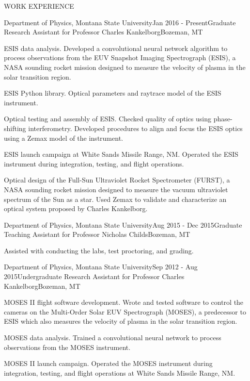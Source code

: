 \documentclass{resume} %
\begin{document}

\begin{rSection}{WORK EXPERIENCE}
\begin{rSubsection}{Department of Physics, Montana State University}{Jan 2016 - Present}{Graduate Research Assistant for Professor Charles Kankelborg}{Bozeman, MT}
	\item ESIS data analysis. Developed a convolutional neural network algorithm to process observations from the EUV Snapshot Imaging Spectrograph (ESIS), a NASA sounding rocket mission designed to measure the velocity of plasma in the solar transition region.
	\item ESIS Python library. Optical parameters and raytrace model of the ESIS instrument.
	\item Optical testing and assembly of ESIS. Checked quality of optics using phase-shifting interferometry. Developed procedures to align and focus the ESIS optics using a Zemax model of the instrument.
	\item ESIS launch campaign at White Sands Missile Range, NM. Operated the ESIS instrument during integration, testing, and flight operations.
	\item Optical design of the Full-Sun Ultraviolet Rocket Spectrometer (FURST), a NASA sounding rocket mission designed to measure the vacuum ultraviolet spectrum of the Sun as a star. Used Zemax to validate and characterize an optical system proposed by Charles Kankelborg.
\end{rSubsection}


\begin{rSubsection}{Department of Physics, Montana State University}{Aug 2015 - Dec 2015}{Graduate Teaching Assistant for Professor Nicholas Childs}{Bozeman, MT}
	\item Assisted with conducting the labs, test proctoring, and grading.
\end{rSubsection}

\begin{rSubsection}{Department of Physics, Montana State University}{Sep 2012 - Aug 2015}{Undergraduate Research Assistant for Professor Charles Kankelborg}{Bozeman, MT}
	\item MOSES II flight software development. Wrote and tested software to control the cameras on the Multi-Order Solar EUV Spectrograph (MOSES), a predecessor to ESIS which also measures the velocity of plasma in the solar transition region. \\
	\item MOSES data analysis. Trained a convolutional neural network to process observations from the MOSES instrument. \\
	\item MOSES II launch campaign. Operated the MOSES instrument during integration, testing, and flight operations at White Sands Missile Range, NM.
\end{rSubsection}


\end{rSection}
\end{document}
